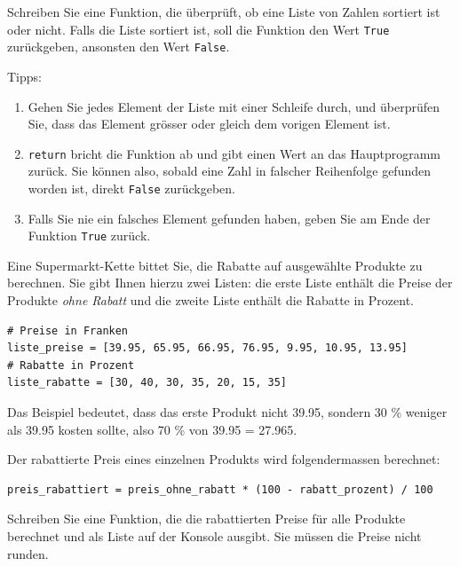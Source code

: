 \begin{mychallenge}
	Schreiben Sie eine Funktion, die überprüft, ob eine Liste von Zahlen sortiert ist oder nicht. Falls die Liste sortiert ist, soll die Funktion den Wert \lstinline|True| zurückgeben, ansonsten den Wert \lstinline|False|.

	Tipps: %
	\begin{enumerate}
		\item Gehen Sie jedes Element der Liste mit einer Schleife durch, und überprüfen Sie, dass das Element grösser oder gleich dem vorigen Element ist.
		\item \lstinline|return| bricht die Funktion ab und gibt einen Wert an das Hauptprogramm zurück. Sie können also, sobald eine Zahl in falscher Reihenfolge gefunden worden ist, direkt \lstinline|False| zurückgeben.
		\item Falls Sie nie ein falsches Element gefunden haben, geben Sie am Ende der Funktion \lstinline|True| zurück.
	\end{enumerate}
	\begin{myanswer}
		
	\end{myanswer}
\end{mychallenge}

\begin{myexercise}
	Eine Supermarkt-Kette bittet Sie, die Rabatte auf ausgewählte Produkte zu berechnen. Sie gibt Ihnen hierzu zwei Listen: die erste Liste enthält die Preise der Produkte \textit{ohne Rabatt} und die zweite Liste enthält die Rabatte in Prozent.

	\begin{lstlisting}
# Preise in Franken
liste_preise = [39.95, 65.95, 66.95, 76.95, 9.95, 10.95, 13.95]
# Rabatte in Prozent
liste_rabatte = [30, 40, 30, 35, 20, 15, 35]
\end{lstlisting}

	Das Beispiel bedeutet, dass das erste Produkt nicht 39.95, sondern 30 \% weniger als 39.95 kosten sollte, also 70 \% von 39.95 = 27.965.

	Der rabattierte Preis eines einzelnen Produkts wird folgendermassen berechnet:
	\begin{lstlisting}
preis_rabattiert = preis_ohne_rabatt * (100 - rabatt_prozent) / 100
\end{lstlisting}
	Schreiben Sie eine Funktion, die die rabattierten Preise für alle Produkte berechnet und als Liste auf der Konsole ausgibt. Sie müssen die Preise nicht runden.

	\begin{myanswer}
		
	\end{myanswer}
\end{myexercise}

